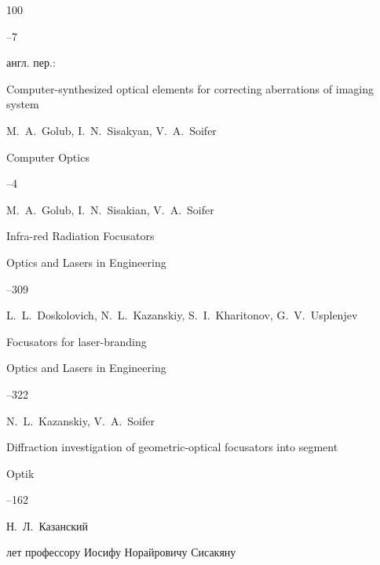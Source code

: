 \begin{thebibliography}{100}

--7

\transl англ. пер.:~

\paper Computer-synthesized optical elements for correcting aberrations of imaging system

\by M.~A.~Golub, I.~N.~Sisakyan, V.~A.~Soifer 

\jour Computer Optics




--4






\by M.~A.~Golub, I.~N.~Sisakian, V.~A.~Soifer

\paper Infra-red Radiation Focusators

\jour Optics and Lasers in Engineering




--309




\by L.~L.~Doskolovich, N.~L.~Kazanskiy, S.~I.~Kharitonov, G.~V.~Usplenjev

\paper Focusators for laser-branding

\jour Optics and Lasers in Engineering




--322




\by N.~L.~Kazanskiy, V.~A.~Soifer

\paper Diffraction investigation of geometric-optical focusators into segment

\jour Optik




--162






\by Н.~Л.~Казанский

 лет профессору Иосифу Норайровичу Сисакяну


\end{thebibliography}
